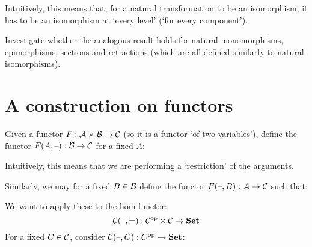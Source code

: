 Intuitively, this means that, for a natural transformation to be an isomorphism,
it has to be an isomorphism at `every level' (`for every component').

\begin{exercise}
Investigate whether the analogous result holds for natural monomorphisms,
epimorphisms, sections and retractions (which are all defined similarly to
natural isomorphisms).
\end{exercise}

\section{A construction on functors}

Given a functor $F: \mathcal{A} \times \mathcal{B} \to \mathcal{C}$ (so it is a functor
`of two variables'), define the functor $F (A, \text{--}): \mathcal{B} \to \mathcal{C}$
for a fixed $A$:

\begin{center}
\end{center}

Intuitively, this means that we are performing a `restriction' of the arguments.

Similarly, we may for a fixed $B \in \mathcal{B}$ define the functor
$F (\text{--}, B) : \mathcal{A} \to \mathcal{C}$ such that:

\begin{center}
\end{center}

We want to apply these to the hom functor:
\[ \mathcal{C} (\text{--}, \text{=}): {\mathcal{C}}^{\mathrm{op}} \times \mathcal{C} \to \mathbf {Set} \]
For a fixed $C \in \mathcal{C}$, consider
$\mathcal{C} (\text{--}, C): C^{\mathrm{op}} \to \mathbf {Set}$:

\begin{center}
\end{center}

